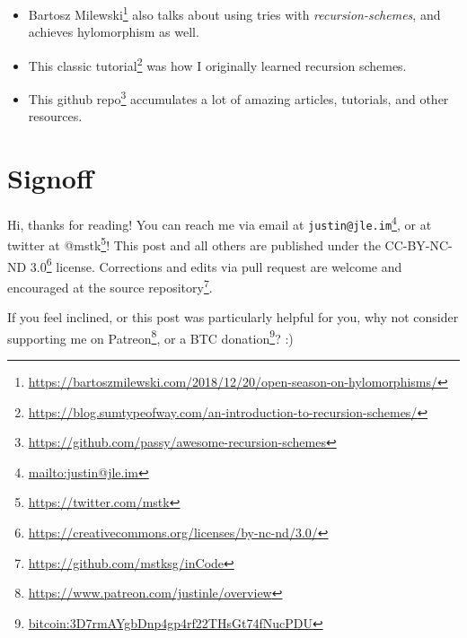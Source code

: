 \documentclass[]{article}
\renewcommand{\href}[2]{#2\footnote{\url{#1}}}
\begin{document}
\begin{itemize}
\tightlist
\item
  \href{https://bartoszmilewski.com/2018/12/20/open-season-on-hylomorphisms/}{Bartosz
  Milewski} also talks about using tries with \emph{recursion-schemes}, and
  achieves hylomorphism as well.
\item
  \href{https://blog.sumtypeofway.com/an-introduction-to-recursion-schemes/}{This
  classic tutorial} was how I originally learned recursion schemes.
\item
  \href{https://github.com/passy/awesome-recursion-schemes}{This github repo}
  accumulates a lot of amazing articles, tutorials, and other resources.
\end{itemize}

\hypertarget{signoff}{%
\section{Signoff}\label{signoff}}

Hi, thanks for reading! You can reach me via email at
\href{mailto:justin@jle.im}{\nolinkurl{justin@jle.im}}, or at twitter at
\href{https://twitter.com/mstk}{@mstk}! This post and all others are published
under the \href{https://creativecommons.org/licenses/by-nc-nd/3.0/}{CC-BY-NC-ND
3.0} license. Corrections and edits via pull request are welcome and encouraged
at \href{https://github.com/mstksg/inCode}{the source repository}.

If you feel inclined, or this post was particularly helpful for you, why not
consider \href{https://www.patreon.com/justinle/overview}{supporting me on
Patreon}, or a \href{bitcoin:3D7rmAYgbDnp4gp4rf22THsGt74fNucPDU}{BTC donation}?
:)
\end{document}
